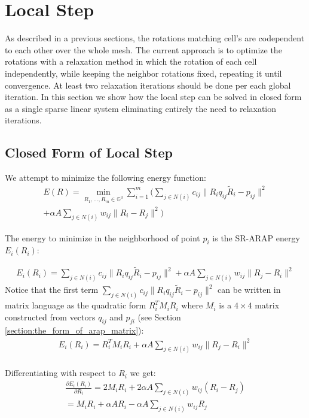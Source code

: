 \documentclass{birkjour}
\numberwithin{equation}{section}
\begin{document}
\section{Local Step}

As described in a previous sections, the rotations matching cell's are codependent to each other over the whole mesh. The current approach is to optimize the rotations with a relaxation method in which the rotation of each cell independently, while keeping the neighbor rotations fixed, repeating it until convergence. At least two relaxation iterations should be done per each global iteration. In this section we show how the local step can be solved in closed form as a single sparse linear system eliminating entirely the need to relaxation iterations.

\subsection{Closed Form of Local Step}

We attempt to minimize the following energy function:
\begin{eqnarray}
E(R) = \min_{R_1,...,R_m \in \mathbb G^3} \sum_{i=1}^m  (  \sum_{j \in N(i)} { c_{ij} \|R_i q_{ij} \tilde R_i -  p_{ij}\|^2 } \\
+ \alpha A \sum_{j \in N(i)} { w_{ij} \|R_i - R_j\|^2 } )
\end{eqnarray}

The energy to minimize in the neighborhood of point $p_i$ is the SR-ARAP energy $E_i(R_i)$:

\begin{eqnarray}
E_i(R_i) =  \sum_{j \in N(i)} { c_{ij} \|R_i q_{ij} \tilde R_i - p_{ij}  \|^2 } + \alpha A \sum_{j \in N(i)} {w_{ij} \| R_j - R_i \|^2} \nonumber
\end{eqnarray}
Notice that the first term $\sum_{j \in N(i)} { c_{ij} \|R_i q_{ij} \tilde R_i - p_{ij}  \|^2 } $ can be written in matrix language as the quadratic form $R_i^T M_i R_i$ where $M_i$ is a $4\times4$ matrix constructed from vectors $q_{ij}$ and $p_{ji}$ (see Section \ref{section:the_form_of_arap_matrix}):
\begin{eqnarray}
		E_i(R_i) = R_i^T M_i R_i + \alpha A \sum_{j \in N(i)} {w_{ij} \| R_j - R_i \|^2  }\\
\end{eqnarray}

Differentiating with respect to $R_i$ we get:
\begin{eqnarray}
	\label{eqn:max_energy}
	\frac{\partial E_i(R_i)}{\partial R_i}  = 2 M_i R_i + 2 \alpha A \sum_{j \in N(i)} {w_{ij} (R_i - R_j) }\\
	= M_i R_i + \alpha A R_i - \alpha A \sum_{j \in N(i)} {w_{ij} R_j }
\end{eqnarray}
\end{document}
